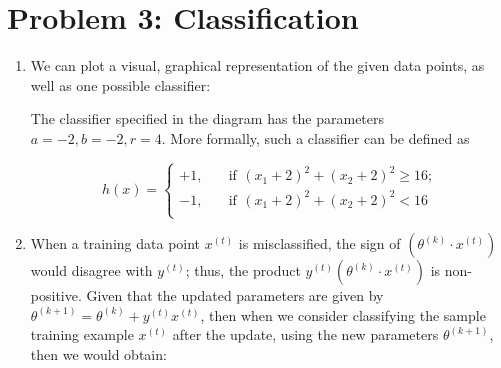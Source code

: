 \documentclass[11pt,fancychapters]{article}
\begin{document}
\section*{Problem 3: Classification}

\begin{enumerate}[label=\textbf{(\alph*)}]
	
\item We can plot a visual, graphical representation of the given data points, as well as one possible classifier:

\begin{figure}[!h]
	\centering
\end{figure}

The classifier specified in the diagram has the parameters $a = -2, b = -2, r = 4$. More formally, such a classifier can be defined as

\begin{equation*}
	h(x) = \begin{cases}
		+1, \quad &\text{if} \, ~ (x_1+2)^2 + (x_2+2)^2 \geq 16; \\
		-1, \quad &\text{if} \, ~ (x_1+2)^2 + (x_2+2)^2 < 16 \\
	\end{cases}
\end{equation*}

\item When a training data point $x^{(t)}$ is misclassified, the sign of $(\theta^{(k)} \cdot x^{(t)})$ would disagree with $y^{(t)}$; thus, the product $y^{(t)} (\theta^{(k)} \cdot x^{(t)})$ is non-positive. Given that the updated parameters are given by $\theta^{(k+1)} = \theta^{(k)} + y^{(t)}x^{(t)}$, then when we consider classifying the sample training example $x^{(t)}$ after the update, using the new parameters $\theta^{(k+1)}$, then we would obtain:


\end{enumerate}
\end{document}
